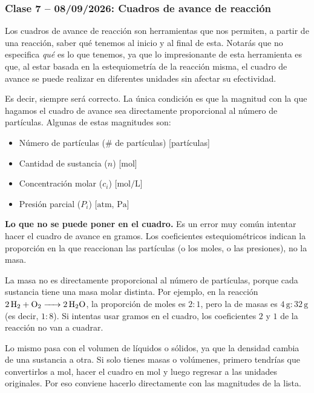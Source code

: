 {}
\subsubsection*{\textcolor{blueunam}{Clase 7 -- 08/09/2026: Cuadros de avance de reacción}}

Los cuadros de avance de reacción son herramientas que nos
permiten, a partir de una reacción, saber qué tenemos al inicio
y al final de esta. Notarás que no especifica \textit{qué} es lo
que tenemos, ya que lo impresionante de esta herramienta es que,
al estar basada en la estequiometría de la reacción misma, el
cuadro de avance se puede realizar en diferentes unidades sin
afectar su efectividad.

Es decir, siempre será correcto. La única condición es que la
magnitud con la que hagamos el cuadro de avance sea directamente
proporcional al número de partículas. Algunas de estas magnitudes
son:
\begin{itemize}
    \item Número de partículas ($\#$ de partículas) [partículas]
    \item Cantidad de sustancia ($n$) [$\mathrm{mol}$]
    \item Concentración molar ($c_i$) [$\mathrm{mol/L}$]
    \item Presión parcial ($P_i$) [$\mathrm{atm}$, $\mathrm{Pa}$]
\end{itemize}

\textbf{Lo que no se puede poner en el cuadro.} Es un error muy
común intentar hacer el cuadro de avance en gramos. Los
coeficientes estequiométricos indican la proporción en la que
reaccionan las partículas (o los moles, o las presiones), no la
masa.

La masa no es directamente proporcional al número de partículas,
porque cada sustancia tiene una masa molar distinta. Por ejemplo,
en la reacción \(\ce{2H2 + O2 -> 2H2O}\), la proporción de moles
es \(2:1\), pero la de masas es \(4\,\mathrm{g}:32\,\mathrm{g}\)
(es decir, \(1:8\)). Si intentas usar gramos en el cuadro, los
coeficientes \(2\) y \(1\) de la reacción no van a cuadrar.

Lo mismo pasa con el volumen de líquidos o sólidos, ya que la
densidad cambia de una sustancia a otra. Si solo tienes masas o
volúmenes, primero tendrías que convertirlos a mol, hacer el
cuadro en mol y luego regresar a las unidades originales. Por eso
conviene hacerlo directamente con las magnitudes de la lista.


